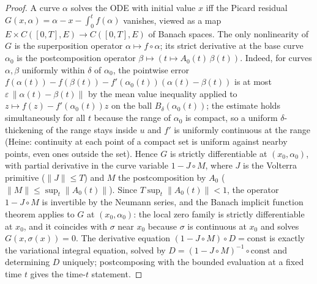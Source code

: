 \begin{proof}
  \sketch

  A curve $\alpha$ solves the ODE with initial value $x$ iff the Picard
  residual $G(x, \alpha) = \alpha - x - \int_0^t f(\alpha)$ vanishes, viewed as
  a map $E \times C([0,T], E) \to C([0,T], E)$ of Banach spaces. The only
  nonlinearity of $G$ is the superposition operator
  $\alpha \mapsto f \circ \alpha$; its strict derivative at the base curve
  $\alpha_0$ is the postcomposition operator
  $\beta \mapsto (t \mapsto A_0(t)\,\beta(t))$. Indeed, for curves
  $\alpha, \beta$ uniformly within $\delta$ of $\alpha_0$, the pointwise error
  $f(\alpha(t)) - f(\beta(t)) - f'(\alpha_0(t))(\alpha(t) - \beta(t))$ is at
  most $\varepsilon\,\|\alpha(t) - \beta(t)\|$ by the mean value inequality
  applied to $z \mapsto f(z) - f'(\alpha_0(t))z$ on the ball
  $B_\delta(\alpha_0(t))$; the estimate holds simultaneously for all $t$
  because the range of $\alpha_0$ is compact, so a uniform $\delta$-thickening
  of the range stays inside $u$ and $f'$ is uniformly continuous at the range
  (Heine: continuity at each point of a compact set is uniform against nearby
  points, even ones outside the set). Hence $G$ is strictly differentiable at
  $(x_0, \alpha_0)$, with partial derivative in the curve variable
  $1 - J \circ M$, where $J$ is the Volterra primitive
  ($\|J\| \le T$) and $M$ the postcomposition by $A_0$
  ($\|M\| \le \sup_t \|A_0(t)\|$). Since $T \sup_t \|A_0(t)\| < 1$, the
  operator $1 - J \circ M$ is invertible by the Neumann series, and the Banach
  implicit function theorem applies to $G$ at $(x_0, \alpha_0)$: the local zero
  family is strictly differentiable at $x_0$, and it coincides with $\sigma$
  near $x_0$ because $\sigma$ is continuous at $x_0$ and solves
  $G(x, \sigma(x)) = 0$. The derivative equation
  $(1 - J \circ M) \circ D = \mathrm{const}$ is exactly the variational
  integral equation, solved by $D = (1 - J \circ M)^{-1} \circ \mathrm{const}$
  and determining $D$ uniquely; postcomposing with the bounded evaluation at a
  fixed time $t$ gives the time-$t$ statement.
\end{proof}

